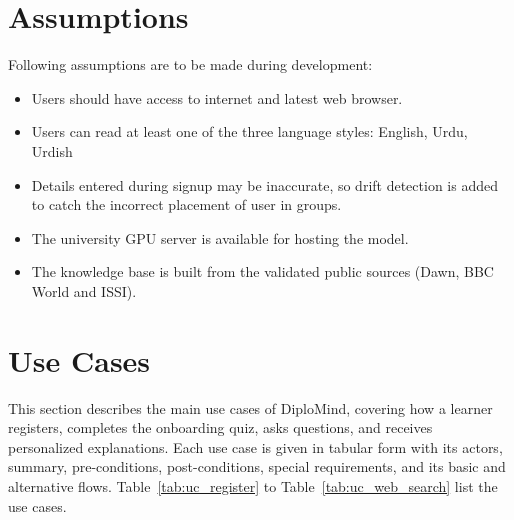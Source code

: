 \documentclass{FastFyp}
\begin{document}
\section{Assumptions}
Following assumptions are to be made during development:

\begin{itemize}
    \item Users should have access to internet and latest web browser.
    \item Users can read at least one of the three language styles: English, Urdu, Urdish
    \item Details entered during signup may be inaccurate, so drift detection is added to catch the incorrect placement of user in groups.
    \item The university GPU server is available for hosting the model.
    \item The knowledge base is built from the validated public sources (Dawn, BBC World and ISSI).
\end{itemize}
\clearpage
\section{Use Cases}
This section describes the main use cases of DiploMind, covering how a learner registers, completes the onboarding quiz, asks questions, and receives personalized explanations. Each use case is given in tabular form with its actors, summary, pre-conditions, post-conditions, special requirements, and its basic and alternative flows. Table~\ref{tab:uc_register} to Table~\ref{tab:uc_web_search} list the use cases.
\providecommand{\keephline}{\multispan{5}\unskip\leaders\hrule height \arrayrulewidth\hfill\cr\noalign{\nobreak}}
\end{document}

